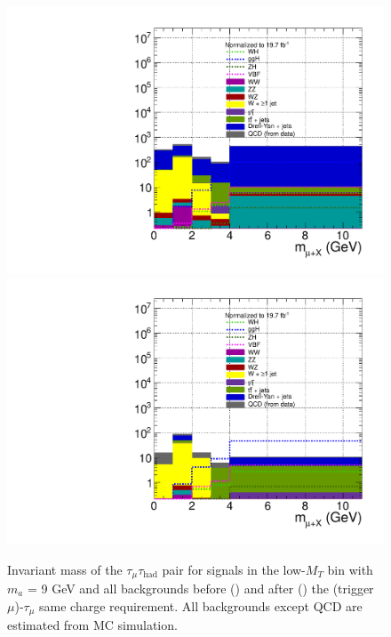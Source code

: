 \begin{figure}[hbtp]
  \begin{center}
    \includegraphics[width=1.2\cmsFigWidth]{figures/muHadMass_lowMT_beforeOSSF}
    \includegraphics[width=1.2\cmsFigWidth]{figures/muHadMass_lowMT_afterOSSF}
    \caption{Invariant mass of the $\tau_{\mu}\tau_{\text{had}}$ pair for signals in the low-$M_{T}$ bin with $m_a$ = 9 GeV and all backgrounds before (\cmsLeft) and after (\cmsRight) the (trigger $\mu$)-$\tau_{\mu}$ same charge requirement.  All backgrounds except QCD are estimated from MC simulation. }
    \label{fig:muHadMass_OSSFVeto_vs_none_lowMT}
  \end{center}
\end{figure}

